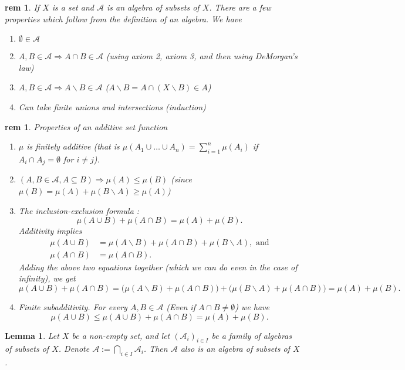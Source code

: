 \documentclass[letterpaper, 12pt]{article}
\newcommand{\fin}{\qquad \quad \hfill \framebox[1.75mm][l]{\,}}
\newcommand{\sA}{\mathcal{A}}
\theoremstyle{stdthm}
\newtheorem{lem}[thm]{Lemma}
\theoremstyle{stddef}
\newtheorem{rem}[thm]{rem} %
\theoremstyle{stdnonum}
\theoremstyle{stdqands}
\theoremstyle{stdbold}
\begin{document}
\begin{rem}
If $X$ is a set and $\sA$ is an algebra of subsets of $X$. There are a few properties which follow from the definition of an algebra. We have
\begin{enumerate}
\item $\emptyset \in \sA$
\item $A,B \in \sA \Rightarrow A\cap B \in \sA$ (using axiom 2, axiom 3, and then using DeMorgan's law)
\item $A,B \in \sA \Rightarrow A\backslash B \in \sA$ ($A\backslash B = A\cap(X \backslash B) \in A$)
\item Can take finite unions and intersections (induction)
\end{enumerate}
\end{rem}

\begin{rem}
Properties of an additive set function
\begin{enumerate}
\item $\mu$ is finitely additive (that is $\mu(A_1\cup\dots\cup A_n) = \sum_{i=1}^n\mu(A_i)$ if $A_i\cap A_j = \emptyset$ for $i\neq j$). 
\item $(A,B \in \sA, A\subseteq B) \Rightarrow \mu(A) \leq \mu(B)$ (since $\mu (B) = \mu(A) + \mu(B\backslash A) \geq \mu(A)$)
\item The inclusion-exclusion formula :
\[\mu(A \cup B) + \mu(A\cap B) = \mu(A) + \mu(B).\]
Additivity implies 
\begin{align*}
\mu(A\cup B) &= \mu(A\backslash B) + \mu(A\cap B) + \mu(B\backslash A), \text{ and}\\
\mu(A\cap B) &= \mu(A \cap B).
\end{align*}
Adding the above two equations together (which we can do even in the case of infinity), we get
\[\mu(A \cup B) + \mu (A\cap B) = \big(\mu(A\backslash B) + \mu(A\cap B)\big) + \big(\mu(B\backslash A)+\mu(A\cap B)\big) = \mu(A) + \mu(B).\]
\item Finite subadditivity. For every $A,B \in \sA$ (Even if $A\cap B \neq \emptyset$) we have
\[\mu(A \cup B) \leq \mu(A \cup B) + \mu(A \cap B) = \mu(A) + \mu(B). \]
\end{enumerate}
\end{rem}

\begin{lem}
Let $X$ be a non-empty set, and let $(\sA_i)_{i\in I}$ be a family of algebras of subsets of $X$. Denote $\sA := \bigcap_{i\in I}\sA_i$. Then $\sA$ also is an algebra of subsets of $X$. 
\end{lem}
\end{document}
